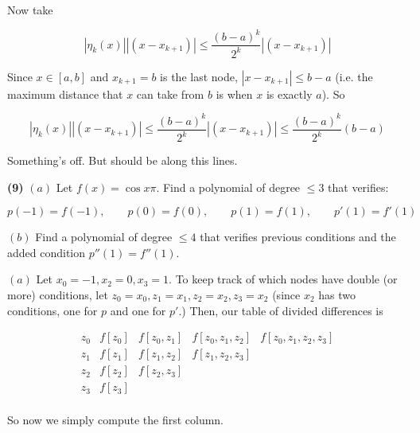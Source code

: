 \documentclass[12pt]{article}
\theoremstyle{definition}
\begin{document}
Now take 


\begin{equation*}
    \left| \eta_{k}(x) \right| \left| (x-x_{k+1}) \right|  \leq
    \frac{(b-a)^k}{2^k} \left| (x-x_{k+1}) \right| 
\end{equation*}

Since $x \in [a, b]$ and $x_{k+1} = b$ is the last node, $\left| x - x_{k+1}
\right| \leq b-a $ (i.e. the maximum distance that $x$ can take from $b$ is when
$x$ is exactly $a$). So 

\begin{equation*}
    \left| \eta_k(x) \right| \left| (x-x_{k+1}) \right| \leq \frac{(b-a)^k}{2^k}
    \left| (x-x_{k+1}) \right|  \leq \frac{(b-a)^k}{2^k}(b-a)
\end{equation*}

Something's off. But should be along this lines.

\pagebreak 

\begin{shaded}
    \textbf{(9)} $(a)$ Let $f(x) = \cos x\pi$. Find a polynomial of degree $\leq 3$ that verifies: 

    \begin{equation*}
        p(-1) = f(-1), \qquad p(0) = f(0), \qquad p(1) = f(1), \qquad p'(1) =
        f'(1)
    \end{equation*}

    $(b)$ Find a polynomial of degree $\leq 4$ that verifies previous conditions
    and the added condition $p''(1) = f''(1)$.
\end{shaded}

$(a)$ Let $x_0 = -1, x_2 = 0, x_3 = 1$. To keep track of which nodes have double (or
more) conditions, let $z_0 = x_0, z_1 = x_1, z_2 = x_2, z_3 = x_2$ (since $x_2$
has two conditions, one for $p$ and one for $p'$.) Then, our table of divided
differences is


\begin{equation*}
    \begin{array}{c|c|c|c|c}
        z_0 & f[z_0] & f[z_0,z_1] & f[z_0,z_1,z_2]&f[z_0,z_1,z_2,z_3]  \\
z_1 & f[z_1] & f[z_1,z_2] & f[z_1,z_2,z_3]  \\
z_2 & f[z_2] & f[z_2,z_3]   \\
z_3 & f[z_3] & & & \\
\end{array}
\end{equation*}

So now we simply compute the first column.
\end{document}
